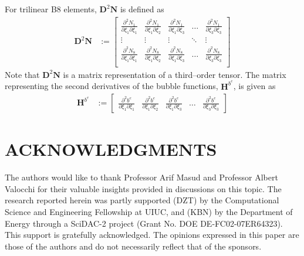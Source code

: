 \documentclass[11pt]{amsart}
\begin{document}
For trilinear B8 elements, $\boldsymbol{D}^2\boldsymbol{N}$ is defined as
\begin{align*}
\boldsymbol{D}^2\boldsymbol{N} &:= \left[ \begin{array}{ccccc} \frac{\partial^2 N_1}{\partial \xi_1 \partial \xi_1} & \frac{\partial^2 N_1}{\partial \xi_1 \partial \xi_2} & \frac{\partial^2 N_1}{\partial \xi_1 \partial \xi_3}& \hdots & \frac{\partial^2 N_1}{\partial \xi_3 \partial \xi_3} \\
\vdots & \vdots & \vdots  & \ddots & \vdots  \\
\frac{\partial^2 N_8}{\partial \xi_1 \partial \xi_1} & \frac{\partial^2 N_8}{\partial \xi_1 \partial \xi_2} & \frac{\partial^2 N_8}{\partial \xi_1 \partial \xi_3} & \hdots & \frac{\partial^2 N_8}{\partial \xi_3 \partial \xi_3}  \\
 \end{array} \right] 
\end{align*}
Note that $\boldsymbol{D}^2\boldsymbol{N}$ is a matrix representation of a third--order tensor.  The matrix representing the second derivatives of the bubble functions, $\boldsymbol{H}^{b^e}$, is given as 
\begin{align*}
\boldsymbol{H}^{b^e} &:= \left[ \begin{array}{ccccc} \frac{\partial^2 b^e}{\partial \xi_1 \partial \xi_1} & \frac{\partial^2 b^e}{\partial \xi_1 \partial \xi_2} & \frac{\partial^2 b^e}{\partial \xi_1 \partial \xi_3}& \hdots & \frac{\partial^2 b^e}{\partial \xi_3 \partial \xi_3} \end{array} \right] 
\end{align*} 

\section*{ACKNOWLEDGMENTS}
The authors would like to thank Professor Arif Masud and Professor Albert Valocchi for their valuable insights provided in discussions on this topic. The research reported herein was partly 
supported (DZT) by the Computational Science and Engineering Fellowship at UIUC, and (KBN) by the Department of Energy through a SciDAC-2 project (Grant No. 
DOE DE-FC02-07ER64323). This support is gratefully acknowledged. The opinions 
expressed in this paper are those of the authors and do not necessarily reflect 
that of the sponsors. 



\newpage
\end{document}
